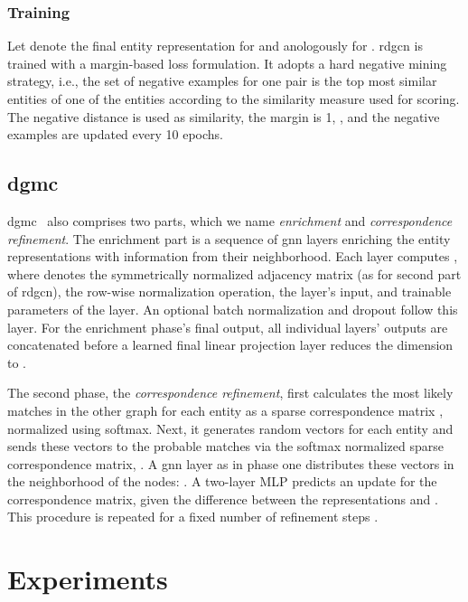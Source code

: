 \documentclass[runningheads]{llncs}
\begin{document}
\subsubsection{Training}
Let  denote the final entity representation for  and anologously  for .
\acrshort{rdgcn} is trained with a margin-based loss formulation.
It adopts a hard negative mining strategy, i.e., the set of negative examples for one pair is the top  most similar entities of one of the entities according to the similarity measure used for scoring. The negative  distance is used as similarity, the margin is 1, , and the negative examples are updated every 10 epochs.

\subsection{\acrfull{dgmc}}
\acrshort{dgmc}~\cite{DBLP:conf/iclr/FeyL0MK20} also comprises two parts, which we name \emph{enrichment} and \emph{correspondence refinement}.
The enrichment part is a sequence of \gls{gnn} layers enriching the entity representations with information from their neighborhood.
Each layer computes
,
where  denotes the symmetrically normalized adjacency matrix (as for second part of \acrshort{rdgcn}),  the row-wise normalization operation,  the layer's input, and  trainable parameters of the layer.
An optional batch normalization and dropout follow this layer.
For the enrichment phase's final output, all individual layers' outputs are concatenated before a learned final linear projection layer reduces the dimension to .

The second phase, the \emph{correspondence refinement}, first calculates the  most likely matches in the other graph for each entity as a sparse correspondence matrix , normalized using softmax.
Next, it generates random vectors for each entity  and sends these vectors to the probable matches via the softmax normalized sparse correspondence matrix, .
A \gls{gnn} layer  as in phase one distributes these vectors in the neighborhood of the nodes: .
A two-layer MLP predicts an update for the correspondence matrix, given the difference between the representations  and .
This procedure is repeated for a fixed number of refinement steps .

\section{Experiments}
\label{sec:experiments}
\end{document}
